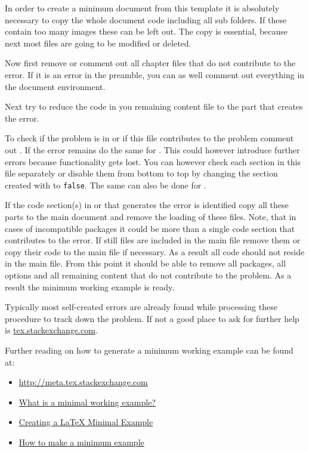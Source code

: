 In order to create a minimum document from this template it is absolutely necessary to copy the whole document code including all sub folders. If these contain too many images these can be left out. The copy is essential, because next most files are going to be modified or deleted.

Now first remove or comment out all chapter files that do not contribute to the error. If it is an error in the preamble, you can as well comment out everything in the document environment.

Next try to reduce the code in you remaining content file to the part that creates the error.

To check if the problem is in  or if this file contributes to the problem comment out . If the error remains do the same for . This could however introduce further errors because functionality gets lost. You can however check each section in this file separately or disable them from bottom to top by changing the section created with  to \texttt{false}. The same can also be done for .

If the code section(s) in  or  that generates the error is identified copy all these parts to the main document and remove the loading of these files. Note, that in cases of incompatible packages it could be more than a single code section that contributes to the error. If still files are included in the main file remove them or copy their code to the main file if necessary. As a result all code should not reside in the main file. From this point it should be able to remove all packages, all options and all remaining content that do not contribute to the problem. As a result the minimum working example is ready.

Typically most self-created errors are already found while processing these procedure to track down the problem. If not a good place to ask for further help is \href{http://tex.stackexchange.com}{tex.stackexchange.com}.

Further reading on how to generate a minimum working example can be found at:
\begin{itemize}
\item \href{http://meta.tex.stackexchange.com/questions/228/ive-just-been-asked-to-write-a-minimal-example-what-is-that}{http://meta.tex.stackexchange.com}
%
\item \href{http://www.faulhammer.org/mini-en.pdf}{What is a minimal working example?}
%
\item \href{http://theoval.cmp.uea.ac.uk/~nlct/latex/minexample/minexample.pdf}{Creating a LaTeX Minimal Example}
%
\item \href{http://www.tex.ac.uk/cgi-bin/texfaq2html?label=minxampl}{How to make a minimum example}
\end{itemize}

